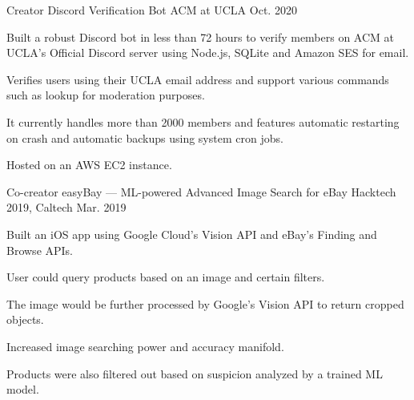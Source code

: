 
\begin{cventries}

  \cventry
    {Creator} %
    {Discord Verification Bot} %
    {ACM at UCLA} %
    {Oct. 2020} %
    {
      \begin{cvitems} %
        \item {Built a robust Discord bot in less than 72 hours to verify members on ACM at UCLA’s Official Discord server using Node.js, SQLite and Amazon SES for email.}
        \item{Verifies users using their UCLA email address and support various commands such as lookup for moderation purposes.}
        \item{It currently handles more than 2000 members and features automatic restarting on crash and automatic backups using system cron jobs.}
        \item{Hosted on an AWS EC2 instance.}
      \end{cvitems}
    }


\cventry
    {Co-creator} %
    {easyBay — ML-powered Advanced Image Search for eBay} %
    {Hacktech 2019, Caltech} %
    {Mar. 2019} %
    {
      \begin{cvitems} %
        \item{Built an iOS app using Google Cloud’s Vision API and eBay’s Finding and Browse APIs.}
        \item{User could query products based on an image and certain filters.}
        \item{The image would be further processed by Google’s Vision API to return cropped objects.}
        \item{Increased image searching power and accuracy manifold.}
        \item{Products were also filtered out based on suspicion analyzed by a trained ML model.}
      \end{cvitems}
    }


\end{cventries}
